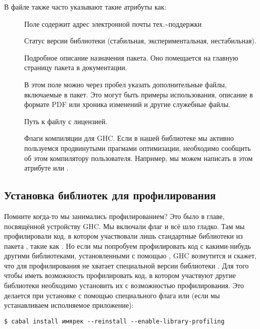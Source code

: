 В файле  также часто указывают такие атрибуты как:

\begin{description}
\item[]
Поле содержит адрес электронной почты тех.\textasciitilde{}поддержки
\item[]
Статус версии библиотеки (стабильная, экспериментальная, нестабильная).
\item[]
Подробное описание назначения пакета. Оно помещается на главную страницу
пакета в документации.
\item[]
В этом поле можно через пробел указать дополнительные файлы, включаемые
в пакет. Это могут быть примеры использования, описание в формате PDF
или хроника изменений и другие служебные файлы.
\item[]
Путь к файлу с лицензией.
\item[]
Флаги компиляции для GHC. Если в нашей библиотеке мы активно пользуемся
продвинутыми прагмами оптимизации, необходимо сообщить об этом
компилятору пользователя. Например, мы можем написать в этом атрибуте
 или .
\end{description}

\subsection{Установка библиотек для профилирования}

Помните когда-то мы занимались профилированием? Это было в главе,
посвящённой устройству GHC. Мы включали флаг  и всё шло
гладко. Там мы профилировали код, в котором участвовали лишь стандартные
библиотеки из пакета , такие как . Но если мы
попробуем профилировать код с какими-нибудь другими библиотеками,
установленными с помощью , GHC возмутится и скажет, что для
профилирования не хватает специальной версии библиотеки . Для
того чтобы иметь возможность профилировать код, в котором участвуют
другие библиотеки необходимо установить их с возможностью
профилирования. Это делается при установке с помощью специального флага
 или
 (если мы устанавливаем исполняемое
приложение):


\begin{verbatim}
$ cabal install имярек --reinstall --enable-library-profiling
\end{verbatim}

